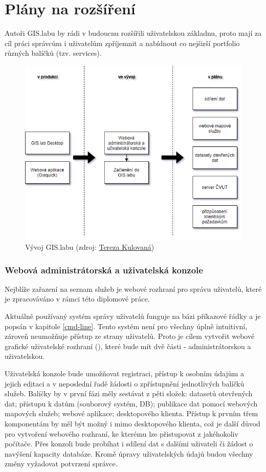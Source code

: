 \section{Plány na rozšíření}
\label{vision}

Autoři GIS.labu by rádi v budoucnu rozšířili uživatelskou základnu,
proto mají za cíl práci správcům i uživatelům zpříjemnit a nabídnout
co nejširší portfolio různých balíčků (tzv. services). 

\begin{figure}[H] \centering
    \includegraphics[width=350pt]{./pictures/gislab_road_map_02.png}
    \caption[Vývoj GIS.labu]{Vývoj GIS.labu (zdroj:
	\href{}{Tereza Kulovaná})}
    \label{fig:gislab-roadmap}
\end{figure}

\subsubsection{Webová administrátorská a uživatelská konzole}

Nejblíže zařazení na seznam služeb je webové rozhraní pro správu
uživatelů, které je zpracováváno v rámci této diplomové
práce. 

Aktuálně používaný systém správy uživatelů funguje na bázi příkazové
řádky a je popsán v kapitole \ref{cmd-line}. Tento systém není pro
všechny úplně intuitivní, zároveň neumožňuje přístup ze strany
uživatelů. Proto je cílem vytvořit webové grafické uživatelské
rozhraní (), které bude mít dvě části - administrátorskou a
uživatelskou.

Uživatelská konzole bude umožňovat registraci, přístup k osobním
údajům a jejich editaci a v neposlední řadě žádosti o zpřístupnění
jednotlivých balíčků služeb. Balíčky by v první fázi měly sestávat z
pěti složek: datasetů otevřených dat; přístupu k datům (souborový
systém, DB); publikace dat pomocí webových mapových služeb; webové
aplikace; desktopového klienta. Přístup k prvním třem komponentám by
měl být možný i mimo desktopového klienta, což je další důvod pro
vytvoření webového rozhraní, ke kterému lze přistupovat z jakéhokoliv
počítače. Přes konzoli bude probíhat i sdílení dat s dalšími uživateli
či žádost o navýšení kapacity databáze. Kromě úpravy uživatelských
údajů budou všechny změny vyžadovat potvrzení správce.

